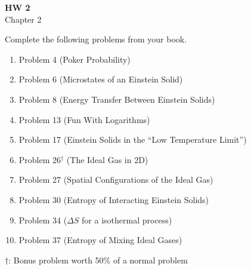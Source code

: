 \documentclass{article}
\begin{document}
\fancyfoot[C]{\thepage}
\vspace*{0cm}
\begin{center}
	{\LARGE \textbf{HW 2}}\\
	\vspace{.25cm}
	{\Large Chapter 2}
\end{center}

Complete the following problems from your book.

\begin{enumerate}
	\item Problem 4 (Poker Probability)
	\item Problem 6 (Microstates of an Einstein Solid)
	\item Problem 8 (Energy Transfer Between Einstein Solids)
	\item Problem 13 (Fun With Logarithms)
	\item Problem 17 (Einstein Solids in the ``Low Temperature Limit'')
	\item Problem 26$^\dagger$ (The Ideal Gas in 2D)
	\item Problem 27 (Spatial Configurations of the Ideal Gas)
	\item Problem 30 (Entropy of Interacting Einstein Solids)
	\item Problem 34 ($\Delta S$ for a isothermal process)
	\item Problem 37 (Entropy of Mixing Ideal Gases)
	
\end{enumerate}
$\dagger$: Bonus problem worth 50\% of a normal problem
\end{document}
